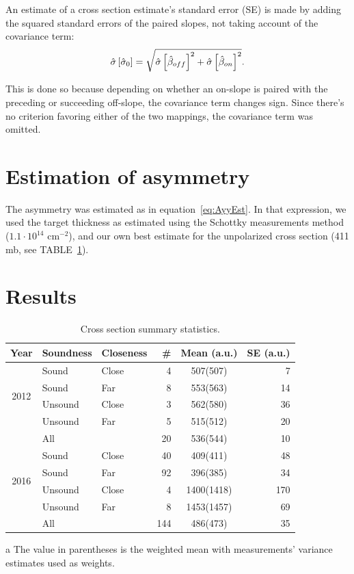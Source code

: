 \documentclass[reprint]{revtex4-1}
\begin{document}
An estimate of a cross section estimate's standard error (SE) is made by adding the squared standard errors of the paired slopes, not taking account of the covariance term:
\begin{equation}
	\SE*{\CS*[0]} = \sqrt{\SE*{\slp*[off]}^2 + \SE*{\slp*[on]}^2}.
\end{equation}

This is done so because depending on whether an on-slope is paired with the preceding or succeeding off-slope, the covariance term changes sign. Since there's no criterion favoring either of the two mappings, the covariance term was omitted.

\section{Estimation of asymmetry}

The asymmetry was estimated as in equation~\eqref{eq:AyyEst}. In that expression, we used the target thickness as estimated using the Schottky measurements method~\cite{Stein} ($1.1\cdot 10^{14}$ cm$^{-2}$), and our own best estimate for the unpolarized cross section (411 mb, see TABLE~\ref{tbl:CS-all}).\\

\section{Results}
\begin{table}
\centering
\begin{threeparttable}
\caption{Cross section summary statistics. \label{tbl:CS-all}}
\begin{tabular}{c|llrcr}
\hline\hline
Year						& Soundness		& Closeness		& \#		& Mean\tnote{a} (a.u.)	& SE (a.u.) \\
\hline
\multirow{4}{*}{2012}		& Sound			& Close			& 4			& 507(507)				& 7  \\
							& Sound			& Far			& 8			& 553(563)				& 14 \\
							& Unsound		& Close			& 3			& 562(580)				& 36 \\
							& Unsound		& Far			& 5			& 515(512)				& 20 \\
							& All			& 				& 20		& 536(544)				& 10 \\
\hline					
\multirow{4}{*}{2016}		& Sound			& Close			& 40		& 409(411)				& 48 \\
							& Sound			& Far			& 92		& 396(385)				& 34 \\
							& Unsound		& Close			& 4			& 1400(1418)			& 170\\
							& Unsound		& Far			& 8			& 1453(1457)			& 69 \\
							& All			& 				& 144		& 486(473)				& 35 \\
\hline\hline
\end{tabular}
\begin{tablenotes}
\item[a] The value in parentheses is the weighted mean with measurements' variance estimates used as weights.
\end{tablenotes}
\end{threeparttable}
\end{table}
\end{document}
